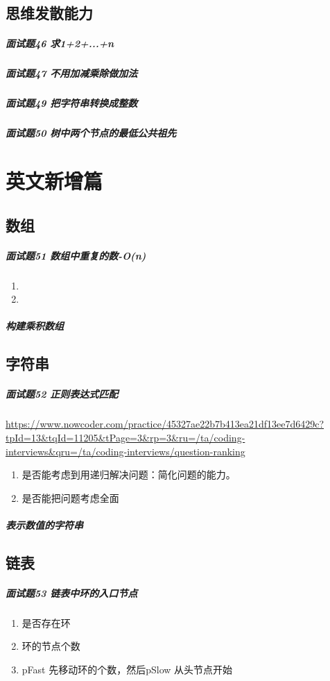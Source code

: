\documentclass[UTF8,a4paper,12pt]{ctexbook}
\begin{document}
		\subsection{思维发散能力}
			\subparagraph{面试题46 求1+2+...+n}
			
			\subparagraph{面试题47 不用加减乘除做加法}
			
			\subparagraph{面试题49 把字符串转换成整数}
			
			\subparagraph{面试题50 树中两个节点的最低公共祖先}
			
	\section{英文新增篇}
		\subsection{数组}
			\subparagraph{面试题51 数组中重复的数-O(n)}
				\begin{enumerate}[itemindent = 2em]
					\item 
					\item 
				\end{enumerate}
			\subparagraph{构建乘积数组}
		
		\subsection{字符串}
			\subparagraph{面试题52 正则表达式匹配}
				\url{https://www.nowcoder.com/practice/45327ae22b7b413ea21df13ee7d6429c?tpId=13&tqId=11205&tPage=3&rp=3&ru=/ta/coding-interviews&qru=/ta/coding-interviews/question-ranking}
				\begin{enumerate}[itemindent = 2em]
					\item 是否能考虑到用递归解决问题：简化问题的能力。
					\item 是否能把问题考虑全面
				\end{enumerate}
				
			
			\subparagraph{表示数值的字符串}
			
				
		\subsection{链表}
			\subparagraph{面试题53 链表中环的入口节点}
				\begin{enumerate}[itemindent = 2em]
					\item 是否存在环
					\item 环的节点个数
					\item pFast 先移动环的个数，然后pSlow 从头节点开始
				\end{enumerate}
			
\end{document}

